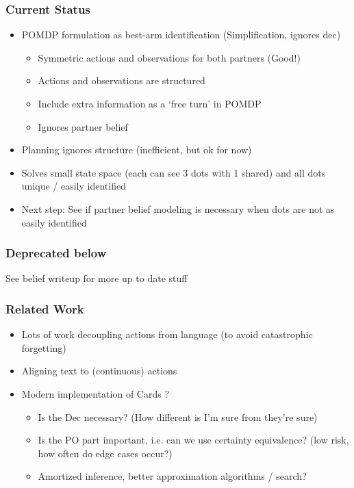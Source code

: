 \documentclass{beamer}
\begin{document}
\begin{frame}
\frametitle{Current Status}
\begin{itemize}
\item POMDP formulation as best-arm identification (Simplification, ignores dec)
    \begin{itemize}
    \item Symmetric actions and observations for both partners (Good!)
    \item Actions and observations are structured
    \item Include extra information as a `free turn' in POMDP
    \item Ignores partner belief
    \end{itemize}
\item Planning ignores structure (inefficient, but ok for now)
\item Solves small state space (each can see 3 dots with 1 shared) and
    all dots unique / easily identified
\item Next step: See if partner belief modeling is necessary
    when dots are not as easily identified
\end{itemize}
\end{frame}

\begin{frame}
\frametitle{Deprecated below}
See belief writeup for more up to date stuff
\end{frame}

\begin{frame}
\frametitle{Related Work}
\begin{itemize}
\item Lots of work decoupling actions from language (to avoid catastrophic forgetting)
\item Aligning text to (continuous) actions \citep{latentactions}
\item Modern implementation of Cards \citep{cards}?
    \begin{itemize}
    \item Is the Dec necessary? (How different is I'm sure from they're sure) 
    \item Is the PO part important, i.e. can we use certainty equivalence?
        (low risk, how often do edge cases occur?)
    \item Amortized inference, better approximation algorithms / search?
    \end{itemize}
\end{itemize}
\end{frame}
\end{document}
